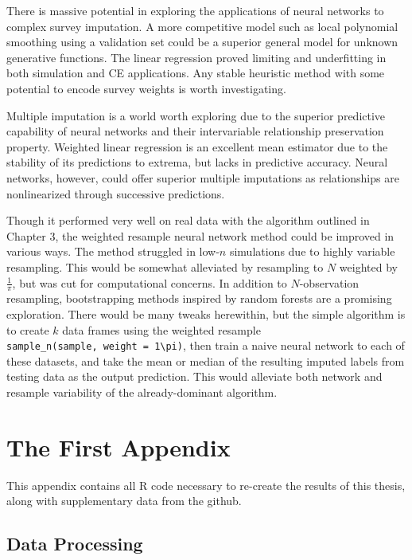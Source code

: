 \documentclass[12pt,twoside]{reedthesis}
\begin{document}
There is massive potential in exploring the applications of neural
networks to complex survey imputation. A more competitive model such as
local polynomial smoothing using a validation set could be a superior
general model for unknown generative functions. The linear regression
proved limiting and underfitting in both simulation and CE applications.
Any stable heuristic method with some potential to encode survey weights
is worth investigating.

Multiple imputation is a world worth exploring due to the superior
predictive capability of neural networks and their intervariable
relationship preservation property. Weighted linear regression is an
excellent mean estimator due to the stability of its predictions to
extrema, but lacks in predictive accuracy. Neural networks, however,
could offer superior multiple imputations as relationships are
nonlinearized through successive predictions.

Though it performed very well on real data with the algorithm outlined
in Chapter 3, the weighted resample neural network method could be
improved in various ways. The method struggled in low-\(n\) simulations
due to highly variable resampling. This would be somewhat alleviated by
resampling to \(N\) weighted by \(\frac{1}{\pi}\), but was cut for
computational concerns. In addition to \(N\)-observation resampling,
bootstrapping methods inspired by random forests are a promising
exploration. There would be many tweaks herewithin, but the simple
algorithm is to create \(k\) data frames using the weighted resample
\texttt{sample\_n(sample,\ weight\ =\ 1\textbackslash{}pi)}, then train
a naive neural network to each of these datasets, and take the mean or
median of the resulting imputed labels from testing data as the output
prediction. This would alleviate both network and resample variability
of the already-dominant algorithm.

\appendix

\chapter{The First Appendix}\label{the-first-appendix}

This appendix contains all R code necessary to re-create the results of
this thesis, along with supplementary data from the github.

\section{Data Processing}\label{sec:data_process}
\end{document}
